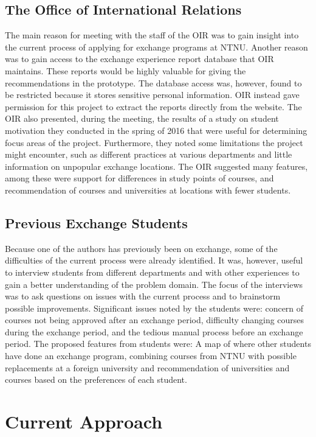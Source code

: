 \subsection{The Office of International Relations}

The main reason for meeting with the staff of the OIR was to gain insight into the current process of applying for exchange programs at NTNU. Another reason was to gain access to the exchange experience report database that OIR maintains. These reports would be highly valuable for giving the recommendations in the prototype. The database access was, however, found to be restricted because it stores sensitive personal information. OIR instead gave permission for this project to extract the reports directly from the website. The OIR also presented, during the meeting, the results of a study on student motivation they conducted in the spring of 2016 that were useful for determining focus areas of the project. Furthermore, they noted some limitations the project might encounter, such as different practices at various departments and little information on unpopular exchange locations. The OIR suggested many features, among these were support for differences in study points of courses, and recommendation of courses and universities at locations with fewer students.

\subsection{Previous Exchange Students}

Because one of the authors has previously been on exchange, some of the difficulties of the current process were already identified. It was, however, useful to interview students from different departments and with other experiences to gain a better understanding of the problem domain. The focus of the interviews was to ask questions on issues with the current process and to brainstorm possible improvements. Significant issues noted by the students were: concern of courses not being approved after an exchange period, difficulty changing courses during the exchange period, and the tedious manual process before an exchange period. The proposed features from students were: A map of where other students have done an exchange program, combining courses from NTNU with possible replacements at a foreign university and recommendation of universities and courses based on the preferences of each student. 

\section{Current Approach}

